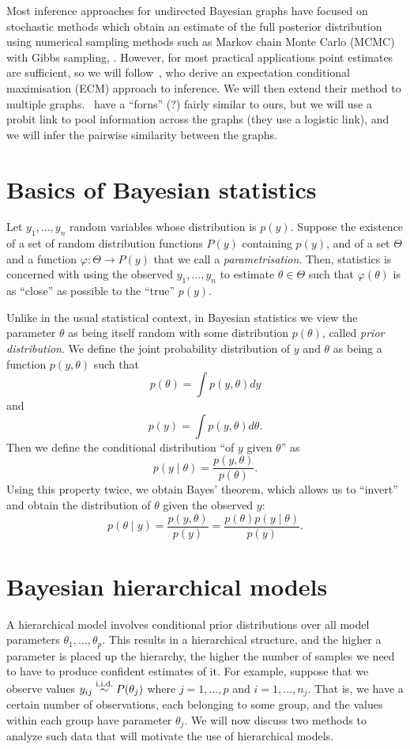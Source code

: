 \documentclass[a4paper, 11pt, oneside]{report}
\newcommand{\iid}{\stackrel{\textmd{i.i.d.}}{\sim}}
\newcommand{\1}{\mathds{1}}
\begin{document}
Most inference approaches for undirected Bayesian graphs have focused on
stochastic methods which obtain an estimate of the full posterior distribution
using numerical sampling methods such as Markov chain Monte Carlo (MCMC) with
Gibbs sampling, \parencite{wang-2015}. However, for most practical applications
point estimates are sufficient, so we will follow~\cite{limcco-2017}, who
derive an expectation conditional maximisation (ECM) approach to inference. We
will then extend their method to multiple graphs.~\cite{luke2017} have a
``forns'' (?) fairly similar to ours, but we will use a probit link to pool
information across the graphs (they use a logistic link), and we will infer the
pairwise similarity between the graphs.

\section{Basics of Bayesian statistics}
Let $y_1, \dots, y_n$ random variables whose distribution is $p(y)$. Suppose
the existence of a set of random distribution functions $P(y)$ containing
$p(y)$, and of a set $\Theta$ and a function $\varphi: \Theta \to P(y)$ that we
call a \emph{parametrisation}. Then, statistics is concerned with using the
observed $y_1,\dots,y_n$ to estimate $\theta \in \Theta$ such that
$\varphi(\theta)$ is as ``close'' as possible to the ``true'' $p(y)$.

Unlike in the usual statistical context, in Bayesian statistics we view the parameter $\theta$ as
being itself random with some distribution $p(\theta)$, called \emph{prior distribution}. We define the joint
probability distribution of $y$ and $\theta$ as being a function $p(y,\theta)$ such that
\[p(\theta) = \int p(y,\theta) dy\]
and
\[p(y)  = \int p(y,\theta) d\theta.\]
Then we define the conditional distribution ``of $y$ given $\theta$'' as
\[
	p(y \mid \theta) = \frac{p(y,\theta)}{p(\theta)}.
\]
Using this property twice, we obtain Bayes' theorem, which allows us to ``invert''
and obtain the distribution of $\theta$ given the observed $y$:
\[ p(\theta \mid y) = \frac{p(y,\theta)}{p(y)} = \frac{p(\theta)p(y \mid \theta)}{p(y)}. \]

\section{Bayesian hierarchical models}
A hierarchical model involves conditional prior distributions over all model parameters
$\theta_1, \dots, \theta_p$. This results in a hierarchical structure, and the
higher a parameter is placed
up the hierarchy, the higher the number of samples we need to have to produce
confident estimates of it.
For example, suppose that we observe values $y_{ij} \iid P(\theta_j)$ where $j=1,\dots,p$ and
$i=1,\dots,n_j$. That is, we have a certain number of observations,
each belonging to some group, and the values within each group have
parameter $\theta_j$. We will now discuss two methods to analyze such data
that will motivate the use of hierarchical models.
\end{document}
